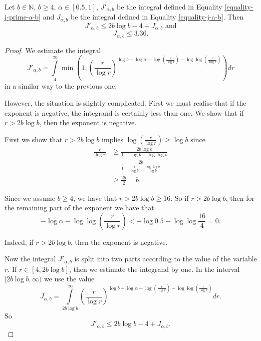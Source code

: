 \begin{lemma}
\label{lemma-estimate-j-a}
Let $b \in \mathbb{N}$, $b \geq 4$, $\alpha \in [0.5, 1]$, $J'_{\alpha, b}$ be the integral defined in Equality \ref{equality-j-prime-a-b} and $J_{\alpha, b}$ be the integral defined in Equality \ref{equality-j-a-b}. Then 
\[
	J'_{\alpha, b} \leq 2b \log b - 4 + J_{\alpha, b} \text{ and}
\]
\[
	J_{\alpha, b} \leq 3.36 \text{.}
\]
\end{lemma}
\begin{proof}
We estimate the integral \[ J'_{\alpha, b} = \int\limits_{4}^\infty \min \left(1, \left(\frac{r}{\log r}\right)^{\log b - \log \alpha - \log \left(\frac{r}{\log r}\right) - \log \log \left(\frac{r}{\log r}\right)}\right) dr \] in a similar way to the previous one. 

However, the situation is slightly complicated. First we must realise that if the exponent is negative, the integrand is certainly less than one. We show that if $r > 2 b \log b$, then the exponent is negative.

First we show that $r > 2 b \log b$ implies $\log \left( \frac{r}{\log r} \right) \geq \log b$ since
\[
\begin{split}
\frac{r}{\log r} 
	& \geq \frac{2 b \log b}{1 + \log b + \log \log b} \\
	& = \frac{2 b}{1 + \frac{1}{\log b} + \frac{\log \log b}{\log b}} \\
	& \geq \frac{2 b}{2} = b \text{.}
\end{split}
\]

Since we assume $b \geq 4$, we have that $r > 2 b \log b \geq 16$. So if $r > 2b \log b$, then for the remaining part of the exponent we have that \[ -\log \alpha - \log \log \left( \frac{r}{\log r} \right) < -\log 0.5 - \log \log \frac{16}{4} = 0 \text{.} \]

Indeed, if $r > 2 b \log b$, then the exponent is negative.

Now the integral $J'_{\alpha, b}$ is split into two parts according to the value of the variable $r$. If $r \in [4, 2b \log b]$, then we estimate the integrand by one. In the interval $[2b \log b, \infty)$ we use the value \[ J_{\alpha, b} = \int\limits_{2 b \log b}^\infty \left(\frac{r}{\log r}\right)^{\log b - \log \alpha - \log \left(\frac{r}{\log r}\right) - \log \log \left(\frac{r}{\log r}\right)} dr \text{.} \] So
\[
J'_{\alpha, b} \leq 2b \log b - 4 + J_{\alpha, b} \text{.}
\]


\end{proof}
